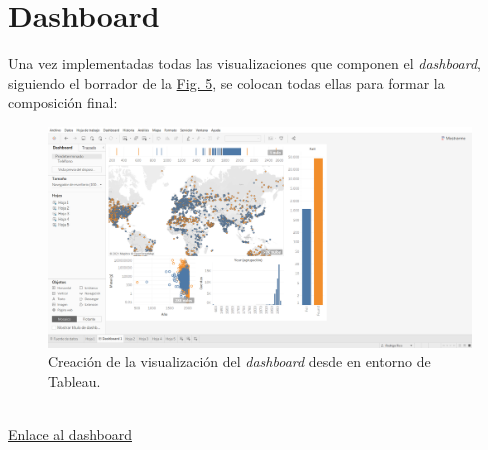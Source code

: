 \documentclass[12pt]{article}
\begin{document}
	\section{Dashboard}
	Una vez implementadas todas las visualizaciones que componen el \textit{dashboard}, siguiendo el borrador de la \hyperref[Fig:borrador]{Fig. 5}, se colocan todas ellas para formar la composición final:\\
	\begin{figure}[h]
		\centering
		\label{Fig:dashboard}
		\includegraphics[width=\textwidth]{Captura de pantalla (67)}
		\caption{Creación de la visualización del \textit{dashboard} desde en entorno de Tableau.}
	\end{figure}
	\\
	\href{https://dub01.online.tableau.com/#/site/rodrigoricogomez/workbooks/612901?:origin=card_share_link}{Enlace al dashboard}\\
	
	
	
	
	
	
	
	
\end{document}

